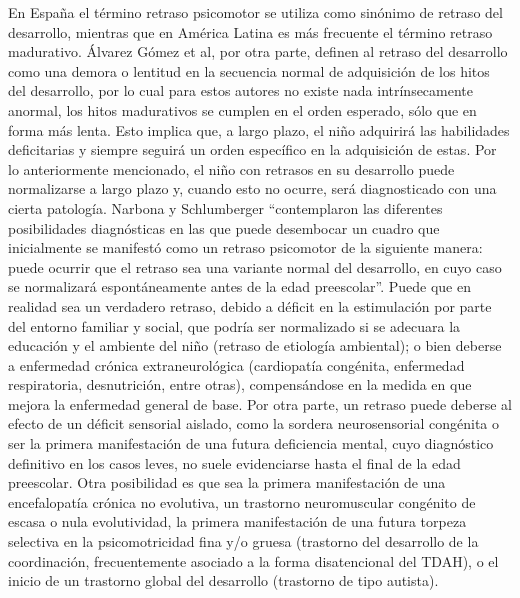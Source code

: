 			En España el término retraso psicomotor se utiliza como sinónimo de retraso del desarrollo, mientras que en América Latina es más frecuente el término retraso madurativo. Álvarez Gómez et al, por otra parte, definen al retraso del desarrollo como una demora o lentitud en la secuencia normal de adquisición de los hitos del desarrollo, por lo cual para estos autores no existe nada intrínsecamente anormal, los hitos madurativos se cumplen en el orden esperado, sólo que en forma más lenta. Esto implica que, a largo plazo, el niño adquirirá las habilidades deficitarias y siempre seguirá un orden específico en la adquisición de estas.
			Por lo anteriormente mencionado, el niño con retrasos en su desarrollo puede normalizarse a largo plazo y, cuando esto no ocurre, será diagnosticado con una cierta patología. Narbona y Schlumberger “contemplaron las diferentes posibilidades diagnósticas en las que puede desembocar un cuadro que inicialmente se manifestó como un retraso psicomotor de la siguiente manera: puede ocurrir que el retraso sea una variante normal del desarrollo, en cuyo caso se normalizará espontáneamente antes de la edad preescolar”. Puede que en realidad sea un verdadero retraso, debido a déficit en la estimulación por parte del entorno familiar y social, que podría ser normalizado si se adecuara la educación y el ambiente del niño (retraso de etiología ambiental); o bien deberse a enfermedad crónica extraneurológica (cardiopatía congénita, enfermedad respiratoria, desnutrición, entre otras), compensándose en la medida en que mejora la enfermedad general de base. Por otra parte, un retraso puede deberse al efecto de un déficit sensorial aislado, como la sordera neurosensorial congénita o ser la primera manifestación de una futura deficiencia mental, cuyo diagnóstico definitivo en los casos leves, no suele evidenciarse hasta el final de la edad preescolar. Otra posibilidad es que sea la primera manifestación de una encefalopatía crónica no evolutiva, un trastorno neuromuscular congénito de escasa o nula evolutividad, la primera manifestación de una futura torpeza selectiva en la psicomotricidad fina y/o gruesa (trastorno del desarrollo de la coordinación, frecuentemente asociado a la forma disatencional del TDAH), o el inicio de un trastorno global del desarrollo (trastorno de tipo autista).\\
